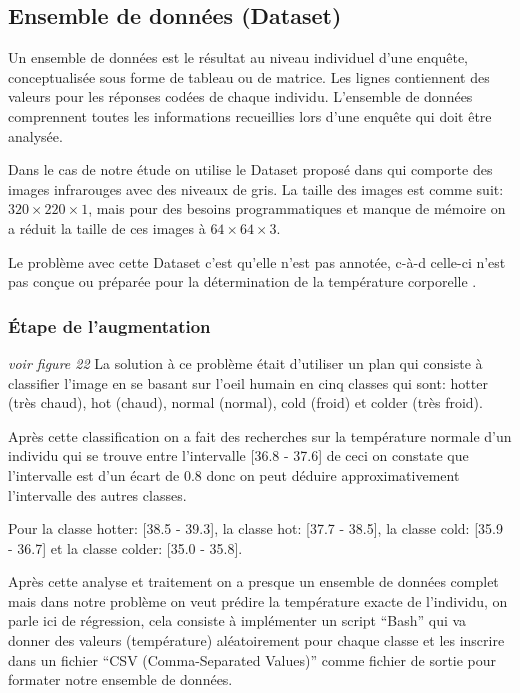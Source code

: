\documentclass[12pt]{article}
\begin{document}

\subsection{Ensemble de données (Dataset)}
Un ensemble de données est le résultat au niveau individuel d’une enquête, conceptualisée sous forme de tableau ou de matrice. Les lignes contiennent des valeurs pour les réponses codées de chaque individu. L’ensemble de données comprennent toutes les informations recueillies lors d'une enquête qui doit être analysée.

Dans le cas de notre étude on utilise le Dataset proposé dans  \cite{47} qui comporte des images infrarouges avec des niveaux de gris. La taille des images est comme suit: $320 \times 220 \times 1$, mais pour des besoins programmatiques et manque de mémoire on a réduit la taille de ces images à $64 \times 64 \times 3$. 

Le problème avec cette Dataset c’est qu’elle n’est pas annotée, c-à-d celle-ci n’est pas conçue ou préparée pour la détermination de la température corporelle .

\subsubsection{\' Etape de l'augmentation} \textit{voir figure 22}
La solution à ce problème était d’utiliser un plan qui consiste à classifier l’image en se basant sur l’oeil humain en cinq classes qui sont: hotter (très chaud), hot (chaud), normal (normal), cold (froid) et colder (très froid).

 Après cette classification on a fait des recherches sur la température normale d’un individu qui se trouve entre l’intervalle [36.8 - 37.6] de ceci on constate que l’intervalle est d’un écart de 0.8 donc on peut déduire approximativement l’intervalle des autres classes.

Pour la classe hotter: [38.5 - 39.3], la classe hot: [37.7 - 38.5], la classe cold: [35.9 - 36.7] et la classe colder: [35.0 - 35.8]. 

Après cette analyse et traitement on a presque un ensemble de données complet mais dans notre problème on veut prédire la température exacte de l’individu, on parle ici de régression, cela consiste à implémenter un script “Bash” qui va donner des valeurs (température) aléatoirement pour chaque classe et les inscrire dans un fichier “CSV (Comma-Separated Values)” comme fichier de sortie pour formater notre ensemble de données.
\end{document}

